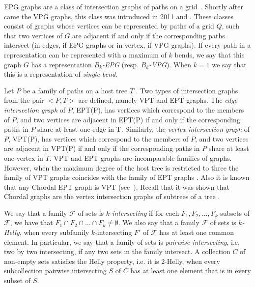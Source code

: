  
 EPG graphs are a class of  intersection graphs of paths on a grid~\cite{golumbic2009}. Shortly after came the VPG graphs, this class was introduced in 2011 \cite{asinowski2011string} and \cite{asinowski2012}. 
 These classes consist of graphs whose vertices can be represented by paths of a grid $ Q$, such that two vertices of $ G $ are adjacent if and only if the corresponding paths intersect (in edges, if EPG graphs or in vertex, if VPG graphs). If every path in a representation can be represented with a maximum of $ k $ bends, we say that this graph $ G $ has a representation \emph{$ B_k$-EPG} (resp. \emph{$ B_k$-VPG}). When $ k = 1 $ we say that this is a representation of \emph{single bend}.

 Let $P$ be a family of paths on a host tree $T$ . Two types of intersection graphs from the pair $<P,T>$ are defined, namely VPT and EPT graphs.
The \textit{edge intersection graph} of $P$, EPT(P), has vertices which correspond to the members of $P$, and two vertices are adjacent in EPT(P) if and only if the corresponding paths in $P$ share at least one edge in T. Similarly, the \textit{vertex intersection graph} of $P$, VPT(P), has vertices which correspond to the members of $P$, and two vertices are adjacent in VPT(P) if and only if the corresponding paths in $P$ share at least one vertex in $T$.
%
VPT and EPT graphs are incomparable families of graphs. However, when the maximum degree of the host tree is restricted to three the family of VPT graphs coincides with the family of EPT graphs \cite{golumbic1985edge}. Also it is known that any Chordal EPT graph is VPT (see~\cite{syslo1985triangulated}). Recall that it was shown that Chordal graphs are the vertex intersection graphs of subtrees of a tree \cite{gavril1974intersection}.

We say that a family  $\mathcal{F}$ of sets is \emph{$k$-intersecting} if for each $F_1, F_2, \dots, F_k$ subsets of $\mathcal{F}$, we have that $F_1\cap F_2 \cap \dots \cap F_k \neq \emptyset$. We also say that a family $\mathcal{F}$  of sets is \emph{$k$-Helly}, when every subfamily $k$-intersecting $F'$ of  $\mathcal{F}$ has at least one common element.
 In particular, we say that a family of sets is \emph{pairwise intersecting}, i.e. two by two intersecting, if any two sets in the family intersect. A collection $ C $ of non-empty sets satisfies the Helly property, i.e. it is $ 2$-Helly, when every subcollection pairwise intersecting $ S $  of $ C $ has at least one element that is in every subset of $ S$.


